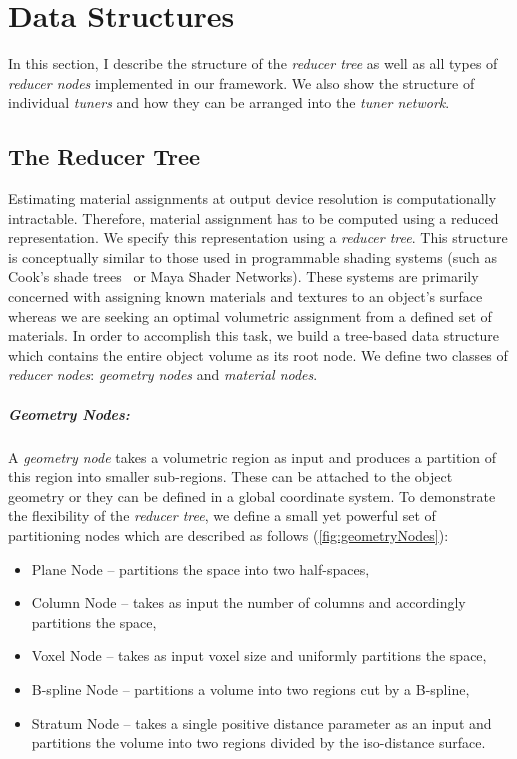 \chapter{Data Structures}
\label{chap:struct}
In this section, I describe the structure of the \emph{reducer tree} as well as all types of \emph{reducer nodes} implemented in our framework. We also show the structure of individual \emph{tuners} and how they can be arranged into the \emph{tuner network}.

\section{The Reducer Tree}
 Estimating material assignments at output device resolution is computationally intractable. Therefore, material assignment has to be computed using a reduced representation. We specify this representation using a \emph{reducer tree}. This structure is conceptually similar to those used in programmable shading systems (such as Cook's shade trees~ or Maya Shader Networks). These systems are primarily concerned with assigning known materials and textures to an object's surface whereas we are seeking an optimal volumetric assignment from a defined set of materials. In order to accomplish this task, we build a tree-based data structure which contains the entire object volume as its root node. We define two classes of \emph{reducer nodes}: \emph{geometry nodes} and \emph{material nodes}.

\paragraph{Geometry Nodes:}A \emph{geometry node} takes a volumetric region as input and produces a partition of this region into smaller sub-regions. 
These can be attached to the object geometry or they can be defined in a global coordinate system.
To demonstrate the flexibility of the \emph{reducer tree}, we define a small yet powerful set of partitioning nodes which are described as follows %
 (\autoref{fig:geometryNodes}):\vspace{-0.25\baselineskip}
\begin{itemize}
\item Plane Node --  partitions the space into two half-spaces, \vspace{-0.25\baselineskip}
\item Column Node -- takes as input the number of columns and accordingly partitions the space,\vspace{-0.25\baselineskip}
\item Voxel Node -- takes as input voxel size and uniformly partitions the space,\vspace{-0.25\baselineskip}
\item B-spline Node -- partitions a volume into two regions cut by a B-spline,\vspace{-0.25\baselineskip}
\item Stratum Node -- takes a single positive distance parameter as an input and partitions the volume into two regions divided by the iso-distance surface.\vspace{-0.25\baselineskip}
\end{itemize} 

